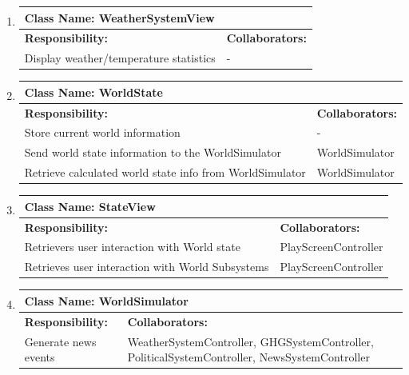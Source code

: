 \documentclass[]{article}
\begin{document}
\begin{enumerate}[1.]
\begin{tabular}{|p{10cm}|p{4cm}|}
	    \hline
	  \end{tabular}

	\item
	\begin{tabular}{|p{10cm}|p{4cm}|}
	    \hline
	     \multicolumn{2}{|l|}{\textbf{Class Name:  WeatherSystemView}} \\
	    \hline
	    \textbf{Responsibility:} & \textbf{Collaborators:} \\
	    \hline
	    Display weather/temperature statistics & - \\

	    \hline
	  \end{tabular}

	\item
	\begin{tabular}{|p{10cm}|p{4cm}|}
	    \hline
	     \multicolumn{2}{|l|}{\textbf{Class Name:  WorldState}} \\
	    \hline
	    \textbf{Responsibility:} & \textbf{Collaborators:} \\
	    \hline
	    Store current world information & - \\
	Send world state information to the WorldSimulator & WorldSimulator \\
	Retrieve calculated world state info from WorldSimulator & WorldSimulator \\

	    \hline
	  \end{tabular}

	\item
	\begin{tabular}{|p{10cm}|p{4cm}|}
	    \hline
	     \multicolumn{2}{|l|}{\textbf{Class Name:  StateView}} \\
	    \hline
	    \textbf{Responsibility:} & \textbf{Collaborators:} \\
	    \hline
	    Retrievers user interaction with World state & PlayScreenController \\
	Retrieves user interaction with World Subsystems & PlayScreenController \\

	    \hline
	  \end{tabular}

	\item
	\begin{tabular}{|p{10cm}|p{4cm}|}
	    \hline
	     \multicolumn{2}{|l|}{\textbf{Class Name:  WorldSimulator}} \\
	    \hline
	    \textbf{Responsibility:} & \textbf{Collaborators:} \\
	    \hline
	    Generate news events & WeatherSystemController, GHGSystemController, PoliticalSystemController, NewsSystemController \\

	    \hline
	  \end{tabular}


\end{enumerate}
\end{document}
